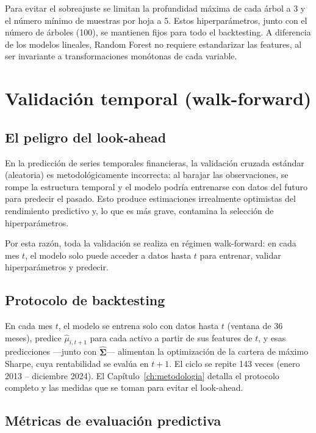 Para evitar el sobreajuste se limitan la profundidad máxima de cada árbol a 3
y el número mínimo de muestras por hoja a 5. Estos hiperparámetros, junto con
el número de árboles (100), se mantienen fijos para todo el backtesting. A
diferencia de los modelos lineales, Random Forest no requiere estandarizar las
features, al ser invariante a transformaciones monótonas de cada variable.

\section{Validación temporal (walk-forward)}

\subsection{El peligro del look-ahead}

En la predicción de series temporales financieras, la validación cruzada
estándar (aleatoria) es metodológicamente incorrecta: al barajar las
observaciones, se rompe la estructura temporal y el modelo podría entrenarse
con datos del futuro para predecir el pasado. Esto produce estimaciones
irrealmente optimistas del rendimiento predictivo y, lo que es más grave,
contamina la selección de hiperparámetros.

Por esta razón, toda la validación se realiza en régimen walk-forward:
en cada mes $t$, el modelo solo puede acceder a datos hasta $t$ para
entrenar, validar hiperparámetros y predecir.

\subsection{Protocolo de backtesting}

En cada mes $t$, el modelo se entrena solo con datos hasta $t$ (ventana de 36
meses), predice $\hat{\mu}_{i,t+1}$ para cada activo a partir de sus features de
$t$, y esas predicciones ---junto con $\hat{\boldsymbol{\Sigma}}$--- alimentan la
optimización de la cartera de máximo Sharpe, cuya rentabilidad se evalúa en
$t+1$. El ciclo se repite 143 veces (enero 2013 -- diciembre 2024). El
Capítulo~\ref{ch:metodologia} detalla el protocolo completo y las medidas que
se toman para evitar el look-ahead.

\subsection{Métricas de evaluación predictiva}

